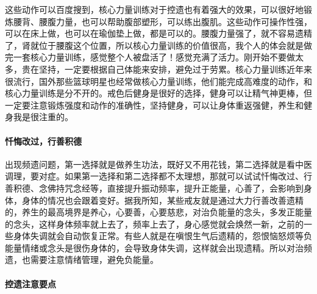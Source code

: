 这些动作可以百度搜到，核心力量训练对于控遗也有着强大的效果，可以很好地锻炼腰背、腰腹力量，也可以帮助腹部塑形，可以练出腹肌。这些动作可操作性强，可以在床上做，也可以在瑜伽垫上做，都是可以的。腰腹力量强了，就不容易遗精了，肾就位于腰腹这个位置，所以核心力量训练的价值很高，我个人的体会就是做完一套核心力量训练，感觉整个人被盘活了！感觉充满了活力。刚开始不要做太多，贵在坚持，一定要根据自己体能来安排，避免过于劳累。核心力量训练近年来很流行，国外那些篮球明星也经常做核心力量训练，他们能完成高难度的动作，和核心力量训练是分不开的。戒色后健身是很好的选择，健身可以让精气神更棒，但一定要注意锻炼强度和动作的准确性，坚持健身，可以让身体重返强健，养生和健身我是很注重的。

\paragraph{忏悔改过，行善积德}

出现频遗问题，第一选择就是做养生功法，既好又不用花钱，第二选择就是看中医调理，要对症。如果第一选择和第二选择都不太理想，那就可以试试忏悔改过、行善积德、念佛持咒念经等，直接提升振动频率，提升正能量，心善了，会影响到身体，身体的情况也会跟着变好。据我所知，某些戒友就是通过大力行善改善遗精的，养生的最高境界是养心，心要善，心要慈悲，对治负能量的念头，多发正能量的念头，这样身体频率就上去了，频率上去了，身心感觉就会焕然一新，之前的一些身体失调就会自动恢复正常。有些人就是在嗔恨生气后遗精的，怨恨恼怒烦等负能量情绪或念头是很伤身体的，会导致身体失调，这样就会出现遗精。所以对治频遗，也需要注意情绪管理，避免负能量。

\paragraph{控遗注意要点}

